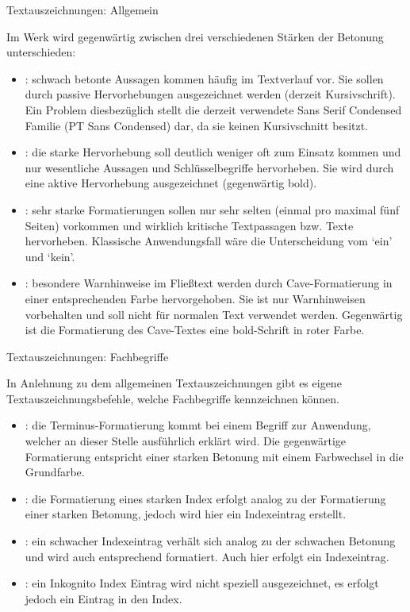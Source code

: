 \documentclass[
ngerman,
paper=a4,
asymmetric,
fontsize=10pt,
draft=false,
numbers=noenddot,
bibtotocnumbered,
footnotes=multiple,
toc=flat,
]{scrbook}
\begin{document}
\Text
{Textauszeichnungen:  Allgemein}
{Im Werk wird gegenwärtig zwischen drei verschiedenen Stärken
der Betonung unterschieden:

\begin{itemize}
  \item {}: schwach betonte Aussagen kommen häufig im
  Textverlauf vor. Sie sollen durch passive Hervorhebungen
  ausgezeichnet werden (derzeit Kursivschrift). Ein Problem
  diesbezüglich stellt die derzeit verwendete Sans Serif
  Condensed Familie (PT Sans Condensed) dar, da sie keinen
  Kursivschnitt besitzt.
  \item {}: die starke Hervorhebung soll deutlich
  weniger oft zum Einsatz kommen und nur wesentliche Aussagen
  und Schlüsselbegriffe hervorheben. Sie wird durch eine aktive Hervorhebung ausgezeichnet (gegenwärtig
  bold).
  \item {}: sehr starke Formatierungen sollen
  nur sehr selten (einmal pro maximal fünf Seiten) vorkommen
  und wirklich kritische Textpassagen bzw. Texte hervorheben.
  Klassische Anwendungsfall wäre die Unterscheidung vom \enquote*{ein}
  und \enquote*{kein}.
  \item {}: besondere Warnhinweise im Fließtext werden durch
  Cave-Formatierung in einer entsprechenden Farbe
  hervorgehoben. Sie ist nur Warnhinweisen vorbehalten und soll
  nicht für normalen Text verwendet werden. Gegenwärtig ist
  die Formatierung des Cave-Textes eine bold-Schrift in roter
  Farbe.
\end{itemize}

}
{}
{}
{}
{}




\Text
{Textauszeichnungen: Fachbegriffe}
{In Anlehnung zu dem allgemeinen Textauszeichnungen gibt es
eigene Textauszeichnungsbefehle, welche Fachbegriffe
kennzeichnen können.

\begin{itemize}
  \item {}: die  Terminus-Formatierung
  kommt bei einem Begriff zur Anwendung, welcher an dieser Stelle
  ausführlich erklärt wird. Die
  gegenwärtige Formatierung entspricht einer starken Betonung
  mit einem Farbwechsel in die Grundfarbe.
  \item {}: die Formatierung eines starken
  Index erfolgt analog zu der Formatierung einer starken Betonung, jedoch
  wird hier ein Indexeintrag erstellt.
  \item {}: ein schwacher Indexeintrag
  verhält sich analog zu der schwachen Betonung und wird auch entsprechend
  formatiert. Auch hier erfolgt ein Indexeintrag.
  \item {}: ein Inkognito Index Eintrag
  wird nicht speziell ausgezeichnet, es erfolgt jedoch ein Eintrag in den
  Index.
\end{itemize}
}
{}
{}
{}
{}
\end{document}
